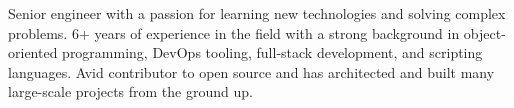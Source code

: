 

\begin{cvparagraph}

Senior engineer with a passion for learning new technologies and solving complex problems. 6+ years of experience in the field with a strong background in object-oriented programming, DevOps tooling, full-stack development, and scripting languages. Avid contributor to open source and has architected and built many large-scale projects from the ground up. 
\end{cvparagraph}
